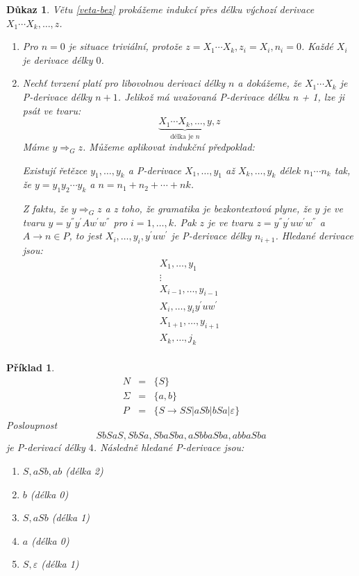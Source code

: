 \documentclass[10pt, a4paper, titlepage]{article}
\theoremstyle{note}
\newtheorem{dukaz}{\textbf{Důkaz}}
\newtheorem{priklad}{\textbf{Příklad}}
\begin{document}
\begin{dukaz}
Větu \ref{veta-bez} prokážeme indukcí přes délku výchozí derivace $X_{1} \cdots X_{k}, \ldots, z$.
\begin{enumerate}
\item
Pro $n = 0$ je situace triviální, protože $z = X_{1} \cdots X_{k}, z_{i} = X_{i}, n_{i} = 0$. Každé $X_{i}$ je derivace délky $0$.

\item
Nechť tvrzení platí pro libovolnou derivaci délky $n$ a dokážeme, že $X_{1} \cdots X_{k}$ je P-derivace délky $n + 1$.
Jelikož má uvažovaná P-derivace délku n + 1, lze ji psát ve tvaru:
$$
\underbrace {X_{1} \cdots X_{k}, \ldots, y}_{\text{délka je } n}, z
$$
Máme $y \Rightarrow_{G}z$. Můžeme aplikovat indukční předpoklad:

Existují řetězce $y_{1}, \ldots, y_{k}$ a P-derivace $X_{1}, \ldots, y_{1}$ až $X_{k}, \ldots, y_{k}$ 
délek $n_{1} \cdots n_{k}$ tak, že $y = y_{1} y_{2} \cdots y_{k}$ a $n = n_{1} + n_{2} + \cdots + n{k}$. 

Z faktu, že $y  \Rightarrow_{G}z$ a z toho, že gramatika je bezkontextová plyne, že $y$ je ve tvaru 
$y = y^{''} y^{'} A w^{'} w^{''}$ pro $i = 1, \ldots, k$. Pak $z$ je ve tvaru $z = y^{''} y^{'} u w^{'} w^{''}$ a $A \rightarrow n \in P$,
to jest $X_{i}, \ldots, y_{i}, y^{'} u w^{'}$ je P-derivace délky $n_{i+1}$. Hledané derivace jsou:
\begin{gather*}
X_{1}, \ldots, y_{1} \\
\vdots \\
X_{i-1}, \ldots, y_{i-1} \\
X_{i}, \ldots, y_{i} y^{'} u w^{'} \\
X_{1+1}, \ldots, y_{i+1} \\
X_{k}, \ldots, j_{k} \\ %
\end{gather*}
\end{enumerate}
\end{dukaz}

\begin{priklad}
\begin{eqnarray*}
N &=& \lbrace S \rbrace \\
\Sigma &=& \lbrace a, b \rbrace \\
P &=& \lbrace S \rightarrow SS|aSb|bSa| \varepsilon \rbrace
\end{eqnarray*}
Posloupnost
$$
SbSaS, SbSa, SbaSba, aSbbaSba , abbaSba
$$
je P-derivací délky $4$.
Následně hledané P-derivace jsou:
\begin{enumerate}
\item
$S, aSb, ab$ (délka 2)
\item
$b$ (délka 0)
\item
$S, aSb$ (délka 1)
\item
$a$ (délka 0)
\item
$S, \varepsilon $ (délka 1)
\end{enumerate}
\end{priklad}
\end{document}

